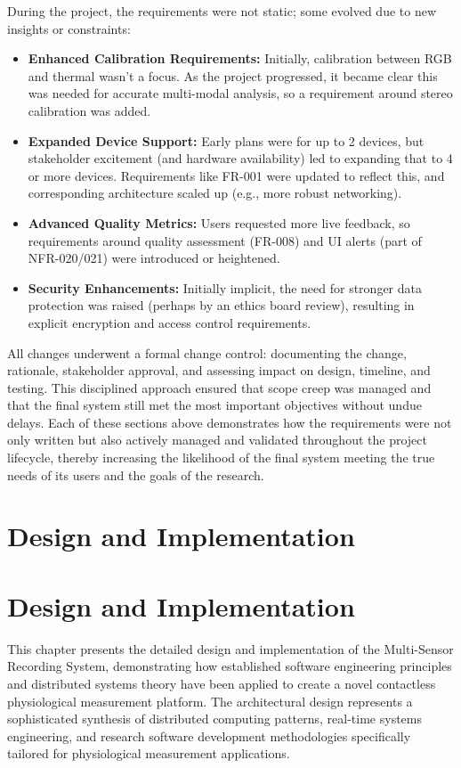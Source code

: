\documentclass[11pt,a4paper]{report}
\begin{document}
During the project, the requirements were not static; some evolved due to new insights or constraints:
\begin{itemize}
\item \textbf{Enhanced Calibration Requirements:} Initially, calibration between RGB and thermal wasn't a focus. As the project progressed, it became clear this was needed for accurate multi-modal analysis, so a requirement around stereo calibration was added.
\item \textbf{Expanded Device Support:} Early plans were for up to 2 devices, but stakeholder excitement (and hardware availability) led to expanding that to 4 or more devices. Requirements like FR-001 were updated to reflect this, and corresponding architecture scaled up (e.g., more robust networking).
\item \textbf{Advanced Quality Metrics:} Users requested more live feedback, so requirements around quality assessment (FR-008) and UI alerts (part of NFR-020/021) were introduced or heightened.
\item \textbf{Security Enhancements:} Initially implicit, the need for stronger data protection was raised (perhaps by an ethics board review), resulting in explicit encryption and access control requirements.
\end{itemize} All changes underwent a formal change control: documenting the change, rationale, stakeholder approval, and assessing impact on design, timeline, and testing. This disciplined approach ensured that scope creep was managed and that the final system still met the most important objectives without undue delays. Each of these sections above demonstrates how the requirements were not only written but also actively managed and validated throughout the project lifecycle, thereby increasing the likelihood of the final system meeting the true needs of its users and the goals of the research.

\chapter{Design and Implementation}
\chapter{Design and Implementation}

This chapter presents the detailed design and implementation of the Multi-Sensor Recording System, demonstrating how established software engineering principles and distributed systems theory have been applied to create a novel contactless physiological measurement platform. The architectural design represents a sophisticated synthesis of distributed computing patterns, real-time systems engineering, and research software development methodologies specifically tailored for physiological measurement applications.
\end{document}
